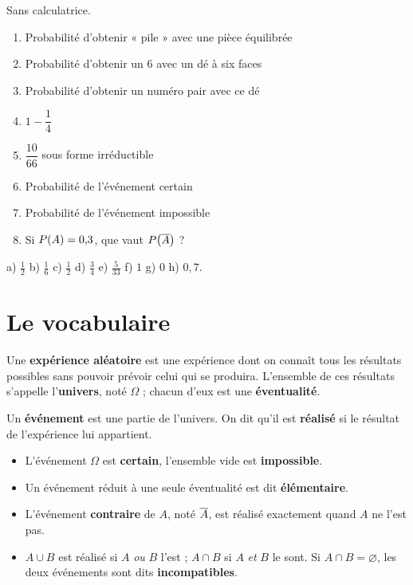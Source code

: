 \begin{automatismes}
Sans calculatrice.

\begin{enumerate}[label=\textbf{\alph*)}, leftmargin=*, itemsep=0.25em]
  \item Probabilité d'obtenir « pile » avec une pièce équilibrée
  \item Probabilité d'obtenir un $6$ avec un dé à six faces
  \item Probabilité d'obtenir un numéro pair avec ce dé
  \item $1-\dfrac{1}{4}$
  \item $\dfrac{10}{66}$ sous forme irréductible
  \item Probabilité de l'événement certain
  \item Probabilité de l'événement impossible
  \item Si $P\!\left(A\right) = 0{,}3$, que vaut $P\!\left(\overline{A}\right)$ ?
\end{enumerate}
\end{automatismes}

\begin{corrige}[automatismes]
a) $\frac12$ \quad b) $\frac16$ \quad c) $\frac12$ \quad d) $\frac34$ \quad
e) $\frac{5}{33}$ \quad f) $1$ \quad g) $0$ \quad h) $0{,}7$.
\end{corrige}

\section{Le vocabulaire}

\begin{definition}
Une \textbf{expérience aléatoire} est une expérience dont on connaît tous
les résultats possibles sans pouvoir prévoir celui qui se produira.
L'ensemble de ces résultats s'appelle l'\textbf{univers}, noté $\Omega$ ;
chacun d'eux est une \textbf{éventualité}.
\end{definition}

\begin{definition}[événement]
Un \textbf{événement} est une partie de l'univers. On dit qu'il est
\textbf{réalisé} si le résultat de l'expérience lui appartient.
\begin{itemize}[leftmargin=1.3em, itemsep=0.12em]
  \item L'événement $\Omega$ est \textbf{certain}, l'ensemble vide est
        \textbf{impossible}.
  \item Un événement réduit à une seule éventualité est dit
        \textbf{élémentaire}.
  \item L'événement \textbf{contraire} de $A$, noté $\overline{A}$, est réalisé
        exactement quand $A$ ne l'est pas.
  \item $A \cup B$ est réalisé si $A$ \emph{ou} $B$ l'est ; $A \cap B$ si
        $A$ \emph{et} $B$ le sont. Si $A \cap B = \varnothing$, les deux
        événements sont dits \textbf{incompatibles}.
\end{itemize}
\end{definition}

